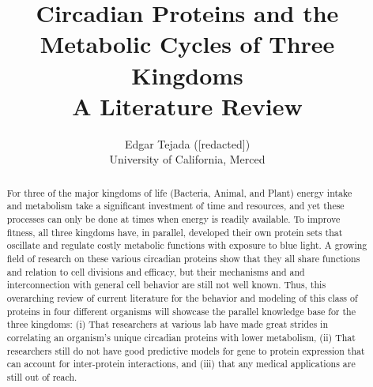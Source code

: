 \documentclass [12pt]{article}
\title{Circadian Proteins and the Metabolic Cycles of Three Kingdoms \\\medskip A Literature Review}
\author{Edgar Tejada ([redacted])\\University of California, Merced}
\begin{document}
\maketitle



\begin{abstract}
	\indent For three of the major kingdoms of life (Bacteria, Animal, and Plant) energy intake and metabolism take a significant investment of time and resources, and yet these processes can only be done at times when energy is readily available. To improve fitness, all three kingdoms have, in parallel, developed their own protein sets that oscillate and regulate costly metabolic functions with exposure to blue light. A growing field of research on these various circadian proteins show that they all share functions and relation to cell divisions and efficacy,  but their mechanisms and and interconnection with general cell behavior are still not well known. Thus, this overarching review of current literature for the behavior and modeling of this class of proteins in four different organisms will showcase the parallel knowledge base for the three kingdoms: (i) That researchers at various lab have made great strides in correlating an organism's unique circadian proteins with lower metabolism, (ii) That researchers still do not have good predictive models for gene to protein expression that can account for inter-protein interactions, and (iii) that any medical applications are still out of reach.
\end{abstract}
\newpage
\end{document}
